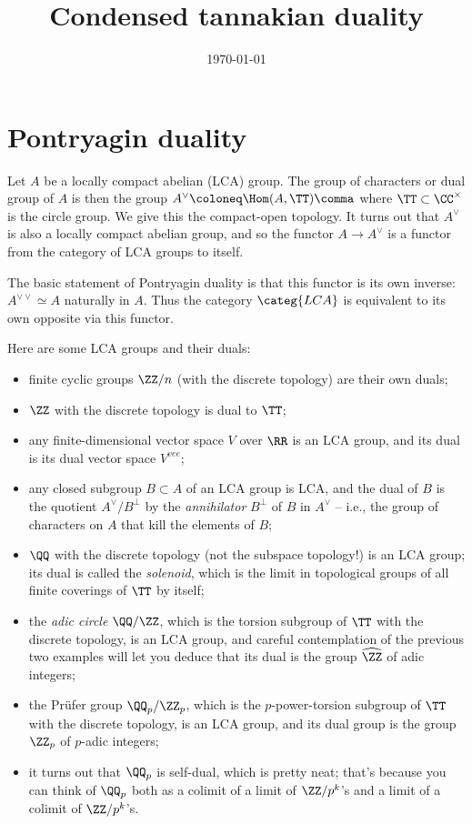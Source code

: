 \documentclass[leqno]{article}
\title{Condensed tannakian duality}
\author{}
\date{\normalsize \today}
\begin{document}
\maketitle

\section{Pontryagin duality}%
\label{pontryagin}

Let \(A\) be a locally compact abelian (LCA) group.
The group of characters or dual group of \(A\) is then the group
\(A^{\vee} \coloneq \Hom(A,\TT) \comma\)
where \(\TT \subset \CC^{\times}\) is the circle group.
We give this the compact-open topology.
It turns out that \(A^{\vee}\) is also a locally compact abelian group,
and so the functor \(A \to A^{\vee}\) is a functor from
the category of LCA groups to itself.


The basic statement of Pontryagin duality is that this functor
is its own inverse: \(A^{\vee\vee} \simeq A\) naturally in \(A\).
Thus the category \(\categ{LCA}\) is equivalent to its own opposite
via this functor.

Here are some LCA groups and their duals:
\begin{itemize}
    \item finite cyclic groups \(\ZZ/n\) (with the discrete topology) are their own duals;
    \item \(\ZZ\) with the discrete topology is dual to \(\TT\);
    \item any finite-dimensional vector space \(V\) over \(\RR\)
        is an LCA group, and its dual is
        its dual vector space \(V^{vee}\);
    \item any closed subgroup \(B \subset A\) of an LCA group is LCA,
        and the dual of \(B\) is the quotient \(A^{\vee}/B^{\perp}\)
        by the \emph{annihilator} \(B^{\perp}\) of \(B\) in
        \(A^{\vee}\) -- i.e., the group of characters on \(A\) that
        kill the elements of \(B\);
    \item \(\QQ\) with the discrete topology
        (not the subspace topology!)
        is an LCA group;
        its dual is called the \emph{solenoid},
        which is the limit in topological groups of
        all finite coverings of \(\TT\) by itself;
    \item the \emph{adic circle} \(\QQ/\ZZ\),
        which is the torsion subgroup of \(\TT\) with the discrete topology,
        is an LCA group,
        and careful contemplation of the previous two examples
        will let you deduce that its dual is the group \(\widehat{\ZZ}\) of adic integers;
    \item the Prüfer group \(\QQ_p/\ZZ_p\),
        which is the \(p\)-power-torsion subgroup of \(\TT\) with the discrete topology,
        is an LCA group,
        and its dual group is the group \(\ZZ_p\) of
        \(p\)-adic integers;
    \item it turns out that \(\QQ_p\) is self-dual,
        which is pretty neat;
        that's because you can think of \(\QQ_p\) both as
        a colimit of a limit of \(\ZZ/p^k\)'s and
        a limit of a colimit of \(\ZZ/p^k\)'s.
\end{itemize}
\end{document}
